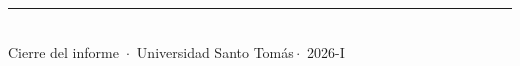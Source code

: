 \documentclass[11pt,a4paper,oneside]{article}
\newcommand{\universidad}{Universidad Santo Tomás}
\newcommand{\periodo}{2026-I}
\begin{document}
\vspace{2em}
\begin{center}
\rule{0.5\textwidth}{0.5pt}\\[0.4em]
{\footnotesize\color{rule}Cierre del informe \,$\cdot$\, \universidad \,$\cdot$\, \periodo}
\end{center}
\end{document}
